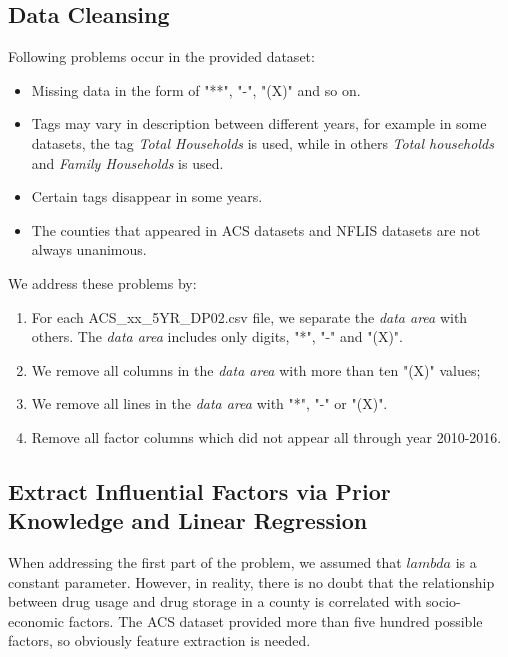 \subsection{Data Cleansing}
Following problems occur in the provided dataset:
\begin{itemize}
	\item Missing data in the form of "**", "-", "(X)" and so on.
	\item Tags may vary in description between different years, for example in some datasets, the tag \textit{Total Households} is used, while in others \textit{Total households} and \textit{Family Households} is used.
	\item Certain tags disappear in some years. 
	\item The counties that appeared in ACS datasets and NFLIS datasets are not always unanimous.
\end{itemize}
We address these problems by:
\begin{enumerate}[step 1.]
	\item For each ACS\_xx\_5YR\_DP02.csv file, we separate the \textit{data area} with others. The \textit{data area} includes only digits, "*", "-" and "(X)". 
	\item We remove all columns in the \textit{data area} with more than ten "(X)" values; 
	\item We remove all lines in the \textit{data area} with  "*", "-" or "(X)".
	\item Remove all factor columns which did not appear all through year 2010-2016.
\end{enumerate}

\subsection{Extract Influential Factors via Prior Knowledge and Linear Regression}
When addressing the first part of the problem, we assumed that $lambda$ is a constant parameter. However, in reality, there is no doubt that the relationship between drug usage and drug storage in a county is correlated with socio-economic factors. The ACS dataset provided more than five hundred possible factors, so obviously feature extraction is needed.


